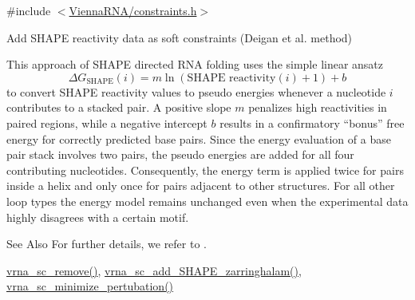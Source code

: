 {\ttfamily \#include $<$\hyperlink{constraints_8h}{Vienna\-R\-N\-A/constraints.\-h}$>$}



Add S\-H\-A\-P\-E reactivity data as soft constraints (Deigan et al. method) 

This approach of S\-H\-A\-P\-E directed R\-N\-A folding uses the simple linear ansatz \[ \Delta G_{\text{SHAPE}}(i) = m \ln(\text{SHAPE reactivity}(i)+1)+ b \] to convert S\-H\-A\-P\-E reactivity values to pseudo energies whenever a nucleotide $ i $ contributes to a stacked pair. A positive slope $ m $ penalizes high reactivities in paired regions, while a negative intercept $ b $ results in a confirmatory ``bonus'' free energy for correctly predicted base pairs. Since the energy evaluation of a base pair stack involves two pairs, the pseudo energies are added for all four contributing nucleotides. Consequently, the energy term is applied twice for pairs inside a helix and only once for pairs adjacent to other structures. For all other loop types the energy model remains unchanged even when the experimental data highly disagrees with a certain motif.

\begin{DoxySeeAlso}{See Also}
For further details, we refer to \cite{deigan:2009}. 

\hyperlink{group__soft__constraints_ga73cdc07b9a199c614367bebef0f2c41a}{vrna\-\_\-sc\-\_\-remove()}, \hyperlink{group__soft__constraints_gaf3c65a045060aef5c4e41693d30af58c}{vrna\-\_\-sc\-\_\-add\-\_\-\-S\-H\-A\-P\-E\-\_\-zarringhalam()}, \hyperlink{group__soft__constraints_gaa124bdc20d88001c38ade590c4bcc3c4}{vrna\-\_\-sc\-\_\-minimize\-\_\-pertubation()}
\end{DoxySeeAlso}

